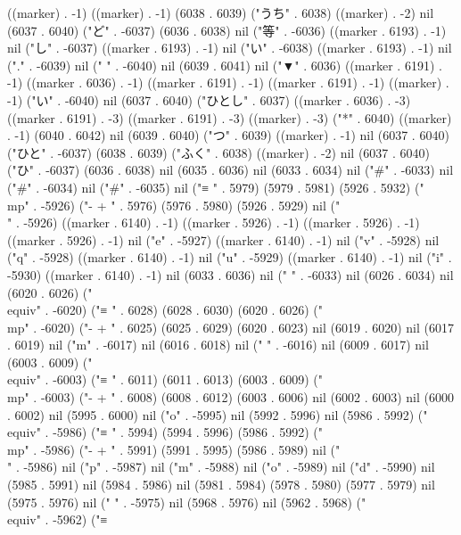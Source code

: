 ((marker) . -1) ((marker) . -1) (6038 . 6039) ("うち" . 6038) ((marker) . -2) nil (6037 . 6040) ("ど" . -6037) (6036 . 6038) nil ("等" . -6036) ((marker . 6193) . -1) nil ("し" . -6037) ((marker . 6193) . -1) nil ("い" . -6038) ((marker . 6193) . -1) nil ("." . -6039) nil (" " . -6040) nil (6039 . 6041) nil ("▼" . 6036) ((marker . 6191) . -1) ((marker . 6036) . -1) ((marker . 6191) . -1) ((marker . 6191) . -1) ((marker) . -1) ("い" . -6040) nil (6037 . 6040) ("ひとし" . 6037) ((marker . 6036) . -3) ((marker . 6191) . -3) ((marker . 6191) . -3) ((marker) . -3) ("*" . 6040) ((marker) . -1) (6040 . 6042) nil (6039 . 6040) ("つ" . 6039) ((marker) . -1) nil (6037 . 6040) ("ひと" . -6037) (6038 . 6039) ("ふく" . 6038) ((marker) . -2) nil (6037 . 6040) ("ひ" . -6037) (6036 . 6038) nil (6035 . 6036) nil (6033 . 6034) nil ("#" . -6033) nil ("#" . -6034) nil ("#" . -6035) nil ("≡
" . 5979) (5979 . 5981) (5926 . 5932) ("\\mp" . -5926) ("-
+
" . 5976) (5976 . 5980) (5926 . 5929) nil ("\\" . -5926) ((marker . 6140) . -1) ((marker . 5926) . -1) ((marker . 5926) . -1) ((marker . 5926) . -1) nil ("e" . -5927) ((marker . 6140) . -1) nil ("v" . -5928) nil ("q" . -5928) ((marker . 6140) . -1) nil ("u" . -5929) ((marker . 6140) . -1) nil ("i" . -5930) ((marker . 6140) . -1) nil (6033 . 6036) nil (" " . -6033) nil (6026 . 6034) nil (6020 . 6026) ("\\equiv" . -6020) ("≡
" . 6028) (6028 . 6030) (6020 . 6026) ("\\mp" . -6020) ("-
+
" . 6025) (6025 . 6029) (6020 . 6023) nil (6019 . 6020) nil (6017 . 6019) nil ("m" . -6017) nil (6016 . 6018) nil (" " . -6016) nil (6009 . 6017) nil (6003 . 6009) ("\\equiv" . -6003) ("≡
" . 6011) (6011 . 6013) (6003 . 6009) ("\\mp" . -6003) ("-
+
" . 6008) (6008 . 6012) (6003 . 6006) nil (6002 . 6003) nil (6000 . 6002) nil (5995 . 6000) nil ("o" . -5995) nil (5992 . 5996) nil (5986 . 5992) ("\\equiv" . -5986) ("≡
" . 5994) (5994 . 5996) (5986 . 5992) ("\\mp" . -5986) ("-
+
" . 5991) (5991 . 5995) (5986 . 5989) nil ("\\" . -5986) nil ("p" . -5987) nil ("m" . -5988) nil ("o" . -5989) nil ("d" . -5990) nil (5985 . 5991) nil (5984 . 5986) nil (5981 . 5984) (5978 . 5980) (5977 . 5979) nil (5975 . 5976) nil (" " . -5975) nil (5968 . 5976) nil (5962 . 5968) ("\\equiv" . -5962) ("≡
